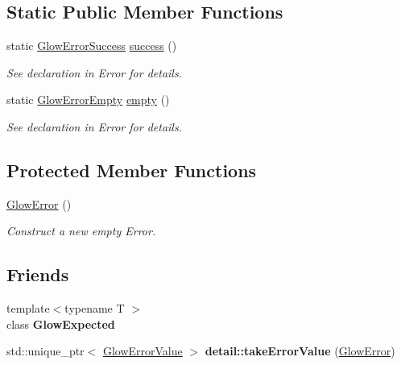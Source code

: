 \subsection*{Static Public Member Functions}
\begin{DoxyCompactItemize}
\item 
static \hyperlink{classglow_1_1detail_1_1_glow_error_success}{Glow\+Error\+Success} \hyperlink{classglow_1_1detail_1_1_glow_error_ace73703b37f7e894290547c34927dba7}{success} ()
\begin{DoxyCompactList}\small\item\em See declaration in Error for details. \end{DoxyCompactList}\item 
static \hyperlink{classglow_1_1detail_1_1_glow_error_empty}{Glow\+Error\+Empty} \hyperlink{classglow_1_1detail_1_1_glow_error_afcbda87e6414c7502d8c0b9b8a348efa}{empty} ()
\begin{DoxyCompactList}\small\item\em See declaration in Error for details. \end{DoxyCompactList}\end{DoxyCompactItemize}
\subsection*{Protected Member Functions}
\begin{DoxyCompactItemize}
\item 
\mbox{\label{classglow_1_1detail_1_1_glow_error_a98b393e8f777d415886d8276c42d9c76}} 
\hyperlink{classglow_1_1detail_1_1_glow_error_a98b393e8f777d415886d8276c42d9c76}{Glow\+Error} ()
\begin{DoxyCompactList}\small\item\em Construct a new empty Error. \end{DoxyCompactList}\end{DoxyCompactItemize}
\subsection*{Friends}
\begin{DoxyCompactItemize}
\item 
\mbox{\label{classglow_1_1detail_1_1_glow_error_a9be753e31f76569c0e7cff1031c7e6c1}} 
{\footnotesize template$<$typename T $>$ }\\class {\bfseries Glow\+Expected}
\item 
\mbox{\label{classglow_1_1detail_1_1_glow_error_a2a4d02be8976bbe9b269ee997a478f19}} 
std\+::unique\+\_\+ptr$<$ \hyperlink{classglow_1_1detail_1_1_glow_error_value}{Glow\+Error\+Value} $>$ {\bfseries detail\+::take\+Error\+Value} (\hyperlink{classglow_1_1detail_1_1_glow_error}{Glow\+Error})
\end{DoxyCompactItemize}


